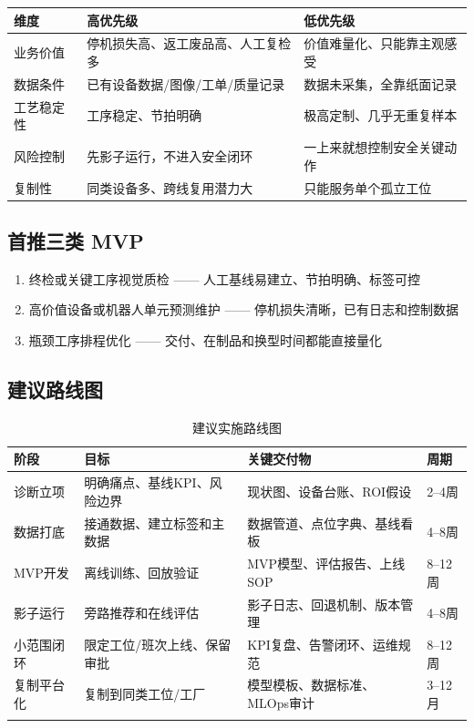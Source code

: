 \documentclass[a4paper,12pt]{ctexart}
\begin{document}
\begin{tabular}{p{5.5cm}p{5.5cm}p{5.5cm}}
\toprule
\textbf{维度} & \textbf{高优先级} & \textbf{低优先级} \\
\midrule
业务价值 & 停机损失高、返工废品高、人工复检多 & 价值难量化、只能靠主观感受 \\
数据条件 & 已有设备数据/图像/工单/质量记录 & 数据未采集，全靠纸面记录 \\
工艺稳定性 & 工序稳定、节拍明确 & 极高定制、几乎无重复样本 \\
风险控制 & 先影子运行，不进入安全闭环 & 一上来就想控制安全关键动作 \\
复制性 & 同类设备多、跨线复用潜力大 & 只能服务单个孤立工位 \\
\bottomrule
\end{tabular}

\subsection{首推三类 MVP}

\begin{enumerate}
\item 终检或关键工序视觉质检 —— 人工基线易建立、节拍明确、标签可控
\item 高价值设备或机器人单元预测维护 —— 停机损失清晰，已有日志和控制数据
\item 瓶颈工序排程优化 —— 交付、在制品和换型时间都能直接量化
\end{enumerate}

\subsection{建议路线图}

\begin{longtable}{p{2cm}p{3.5cm}p{5cm}p{2.5cm}}
\toprule
\textbf{阶段} & \textbf{目标} & \textbf{关键交付物} & \textbf{周期} \\
\midrule
\endhead
诊断立项 & 明确痛点、基线KPI、风险边界 & 现状图、设备台账、ROI假设 & 2--4周 \\
数据打底 & 接通数据、建立标签和主数据 & 数据管道、点位字典、基线看板 & 4--8周 \\
MVP开发 & 离线训练、回放验证 & MVP模型、评估报告、上线SOP & 8--12周 \\
影子运行 & 旁路推荐和在线评估 & 影子日志、回退机制、版本管理 & 4--8周 \\
小范围闭环 & 限定工位/班次上线、保留审批 & KPI复盘、告警闭环、运维规范 & 8--12周 \\
复制平台化 & 复制到同类工位/工厂 & 模型模板、数据标准、MLOps审计 & 3--12月 \\
\bottomrule
\caption{建议实施路线图}
\end{longtable}
\end{document}

